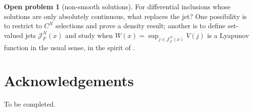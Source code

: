 \documentclass[preprint,12pt,authoryear]{elsarticle}
\theoremstyle{definition}
\newtheorem{problem}{Open problem}
\theoremstyle{remark}
\newcommand{\Jet}{\mathcal{J}}
\begin{document}
\begin{problem}[non-smooth solutions]
For differential inclusions whose solutions are only absolutely continuous, what replaces the jet? One possibility is to restrict to $C^N$ selections and prove a density result; another is to define set-valued jets $\Jet^N_F(x)$ and study when $W(x)=\sup_{j\in\Jet^N_F(x)}V(j)$ is a Lyapunov function in the usual sense, in the spirit of \citet{MolchanovPyatnitskii1989,Blanchini1995}.
\end{problem}

\section*{Acknowledgements}
To be completed.



\end{document}

